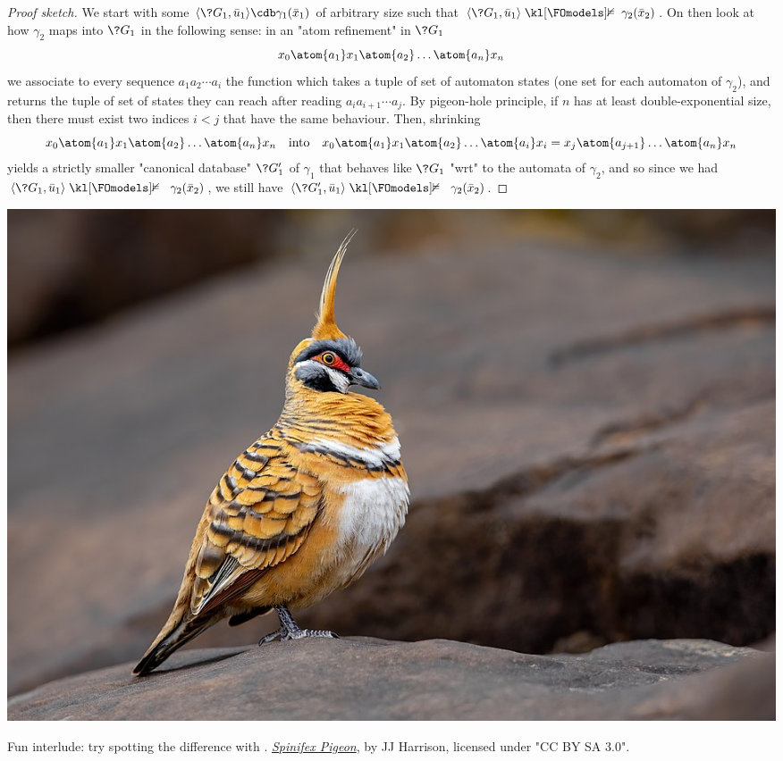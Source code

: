\begin{proof}[Proof sketch]
    We start with some $\tup{\?G_1, \bar u_1} \cdb \gamma_1(\bar x_1)$ of arbitrary size
    such that $\tup{\?G_1, \bar u_1} \notFOmodels \gamma_2(\bar x_2)$.
    On then look at how $\gamma_2$ maps into $\?G_1$ in the following sense:
    in an "atom refinement" in $\?G_1$
    \[
        x_0 \atom{a_1} x_1 \atom{a_2} \dotsc \atom{a_n} x_n
    \]
    we associate to every sequence $a_1 a_{2} \cdots a_i$ the function
    which takes a tuple of set of automaton states (one set for each automaton of $\gamma_2$),
    and returns the tuple of set of states they can reach after reading $a_i a_{i+1} \cdots a_j$.
    By pigeon-hole principle, if $n$ has at least double-exponential size, then there must exist
    two indices $i < j$ that have the same behaviour.
    Then, shrinking \[
        x_0 \atom{a_1} x_1 \atom{a_2} \dotsc \atom{a_n} x_n
    \quad\text{into}\quad
        x_0 \atom{a_1} x_1 \atom{a_2} \dotsc \atom{a_i} x_i = x_j \atom{a_{j+1}} \dotsc \atom{a_n} x_n
    \]
    yields a strictly smaller "canonical database" $\?G'_1$ of $\gamma_1$
    that behaves like $\?G_1$ "wrt" to the automata of $\gamma_2$,
    and so since we had $\tup{\?G_1, \bar u_1} \notFOmodels\ \gamma_2(\bar x_2)$,
    we still have $\tup{\?G'_1, \bar u_1} \notFOmodels\ \gamma_2(\bar x_2)$.
\end{proof}
\begin{marginfigure}[-15em]
    \centering
    \includegraphics[width=\linewidth]{fig/prelim-db/pigeon.jpg}
    \caption{Fun interlude: try spotting the difference with .
    \href{https://commons.wikimedia.org/wiki/File:Spinifex\_Pigeon\_0A2A1585.jpg}{\emph{Spinifex Pigeon}}, by JJ Harrison, licensed under "CC BY SA 3.0".}
\end{marginfigure}

